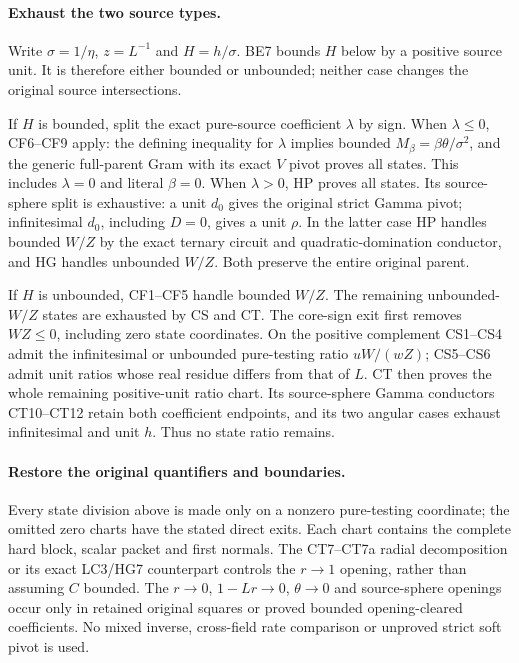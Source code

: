 \paragraph{Exhaust the two source types.}
Write $\sigma=1/\eta$, $z=L^{-1}$ and $H=h/\sigma$.
BE7 bounds $H$ below by a positive source unit.  It is therefore
either bounded or unbounded; neither case changes the original
source intersections.

If $H$ is bounded, split the exact pure-source coefficient
$\lambda$ by sign.  When $\lambda\le0$, CF6--CF9 apply:
the defining inequality for $\lambda$ implies bounded
$M_\beta=\beta\theta/\sigma^2$, and the generic full-parent
Gram with its exact $V$ pivot proves all states.  This includes
$\lambda=0$ and literal $\beta=0$.
When $\lambda>0$, HP proves all states.  Its source-sphere split
is exhaustive: a unit $d_0$ gives the original strict Gamma pivot;
infinitesimal $d_0$, including $D=0$, gives a unit $\rho$.
In the latter case HP handles bounded $W/Z$ by the exact ternary
circuit and quadratic-domination conductor, and HG handles
unbounded $W/Z$.  Both preserve the entire original parent.

If $H$ is unbounded, CF1--CF5 handle bounded $W/Z$.
The remaining unbounded-$W/Z$ states are exhausted by CS and CT.
The core-sign exit first removes $WZ\le0$, including zero state
coordinates.  On the positive complement CS1--CS4 admit the
infinitesimal or unbounded pure-testing ratio
$uW/(wZ)$; CS5--CS6 admit unit ratios whose real residue differs
from that of $L$.  CT then proves the whole remaining positive-unit
ratio chart.  Its source-sphere Gamma conductors CT10--CT12 retain
both coefficient endpoints, and its two angular cases exhaust
infinitesimal and unit $h$.  Thus no state ratio remains.

\paragraph{Restore the original quantifiers and boundaries.}
Every state division above is made only on a nonzero pure-testing
coordinate; the omitted zero charts have the stated direct exits.
Each chart contains the complete hard block, scalar packet and
first normals.  The CT7--CT7a radial decomposition or its exact
LC3/HG7 counterpart controls the $r\to1$ opening, rather than
assuming $C$ bounded.  The $r\to0$, $1-Lr\to0$, $\theta\to0$
and source-sphere openings occur only in retained original squares
or proved bounded opening-cleared coefficients.  No mixed inverse,
cross-field rate comparison or unproved strict soft pivot is used.

